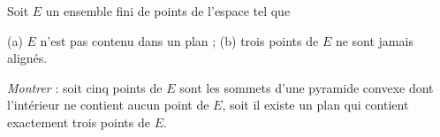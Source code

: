 Soit $E$ un ensemble fini de points de l'espace tel que

(a) $E$ n'est pas contenu dans un plan ; (b) trois points de $E$ ne sont jamais alignés.

\emph{Montrer} : soit cinq points de $E$ sont les sommets d'une pyramide convexe dont l'intérieur ne contient aucun point de $E$, soit il existe un plan qui contient exactement trois points de $E$.

